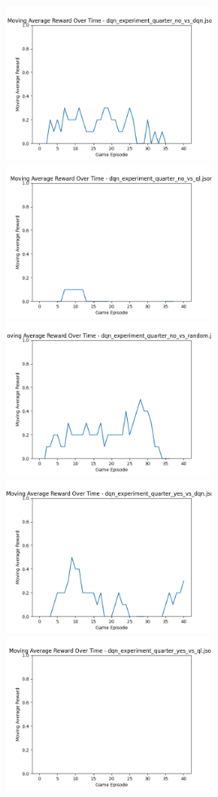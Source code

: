 \includegraphics[width=0.5\textwidth]{images/moving_average_reward_dqn_experiment_quarter_no_vs_dqn.png} 
\includegraphics[width=0.5\textwidth]{images/moving_average_reward_dqn_experiment_quarter_no_vs_ql.png} 
\includegraphics[width=0.5\textwidth]{images/moving_average_reward_dqn_experiment_quarter_no_vs_random.png} 
\includegraphics[width=0.5\textwidth]{images/moving_average_reward_dqn_experiment_quarter_yes_vs_dqn.png} 
\includegraphics[width=0.5\textwidth]{images/moving_average_reward_dqn_experiment_quarter_yes_vs_ql.png} 

